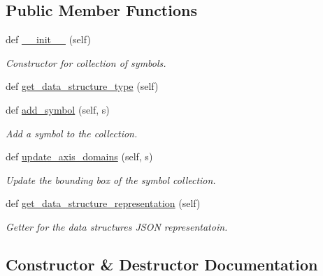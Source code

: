\subsection*{Public Member Functions}
\begin{DoxyCompactItemize}
\item 
def \hyperlink{classbridges_1_1symbol__collection_1_1_symbol_collection_a7ba838d831a2dce6d74fe920c7de52fd}{\+\_\+\+\_\+init\+\_\+\+\_\+} (self)
\begin{DoxyCompactList}\small\item\em Constructor for collection of symbols. \end{DoxyCompactList}\item 
def \hyperlink{classbridges_1_1symbol__collection_1_1_symbol_collection_a84a2d68da2df79389b6bec06ee99f72d}{get\+\_\+data\+\_\+structure\+\_\+type} (self)
\item 
def \hyperlink{classbridges_1_1symbol__collection_1_1_symbol_collection_a11e36a56b1d7dbf23175d4b1ab3cd378}{add\+\_\+symbol} (self, s)
\begin{DoxyCompactList}\small\item\em Add a symbol to the collection. \end{DoxyCompactList}\item 
def \hyperlink{classbridges_1_1symbol__collection_1_1_symbol_collection_af0906b48ee3ee868bb7779561d3f710c}{update\+\_\+axis\+\_\+domains} (self, s)
\begin{DoxyCompactList}\small\item\em Update the bounding box of the symbol collection. \end{DoxyCompactList}\item 
def \hyperlink{classbridges_1_1symbol__collection_1_1_symbol_collection_a09fb16fe5f14457654e5f2680131ccc9}{get\+\_\+data\+\_\+structure\+\_\+representation} (self)
\begin{DoxyCompactList}\small\item\em Getter for the data structure\textquotesingle{}s J\+S\+ON representatoin. \end{DoxyCompactList}\end{DoxyCompactItemize}


\subsection{Constructor \& Destructor Documentation}
\mbox{\label{classbridges_1_1symbol__collection_1_1_symbol_collection_a7ba838d831a2dce6d74fe920c7de52fd}} 
